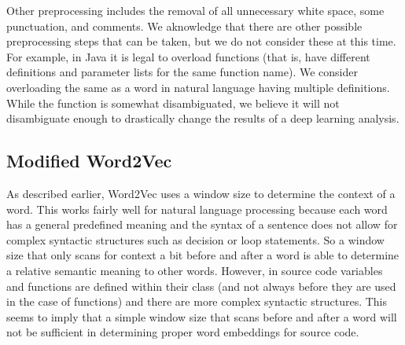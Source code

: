 Other preprocessing includes the removal of all unnecessary white space, some punctuation, and comments. We aknowledge that there are other possible preprocessing steps that can be taken, but we do not consider these at this time. For example, in Java it is legal to overload functions (that is, have different definitions and parameter lists for the same function name). We consider overloading the same as a word in natural language having multiple definitions. While the function is somewhat disambiguated, we believe it will not disambiguate enough to drastically change the results of a deep learning analysis.

\subsection{Modified Word2Vec}

As described earlier, Word2Vec uses a window size to determine the context of a word. This works fairly well for natural language processing because each word has a general predefined meaning and the syntax of a sentence does not allow for complex syntactic structures such as decision or loop statements. So a window size that only scans for context a bit before and after a word is able to determine a relative semantic meaning to other words. However, in source code variables and functions are defined within their class (and not always before they are used in the case of functions) and there are more complex syntactic structures. This seems to imply that a simple window size that scans before and after a word will not be sufficient in determining proper word embeddings for source code.


